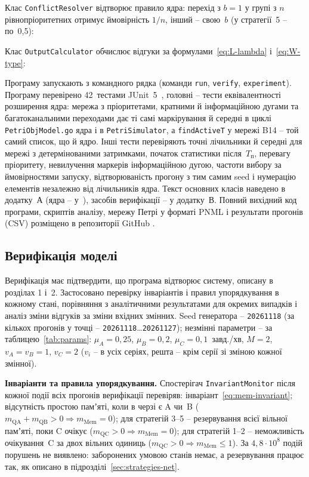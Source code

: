 Клас \texttt{ConflictResolver} відтворює правило ядра: перехід з $b=1$ у групі з $n$
рівнопріоритетних отримує ймовірність $1/n$, інший -- свою~$b$ (у стратегії~5 -- по~0,5):

Клас \texttt{OutputCalculator} обчислює відгуки за формулами~\eqref{eq:L-lambda}
і~\eqref{eq:W-type}:

Програму запускають з командного рядка (команди \texttt{run}, \texttt{verify},
\texttt{experiment}). Програму перевірено 42~тестами JUnit~5~\cite{junit}, головні -- тести
еквівалентності розширення ядра: мережа з пріоритетами, кратними й інформаційною дугами та багатоканальними
переходами дає ті самі маркірування й середні в циклі \texttt{PetriObjModel.go} ядра і в
\texttt{PetriSimulator}, а \texttt{findActiveT} у мережі B14 -- той самий список, що й ядро. Інші
тести перевіряють точні лічильники й середні для мережі з детермінованими затримками, початок
статистики після~$T_{\text{п}}$, перевагу пріоритету, невилучення маркерів інформаційною дугою,
частоти вибору за ймовірностями запуску, відтворюваність прогону з тим самим seed і нумерацію
елементів незалежно від лічильників ядра. Текст
основних класів наведено в додатку~А (ядра -- у~\cite{petriobjmodelpaint}), засобів верифікації --
у додатку~В. Повний вихідний код програми, скриптів аналізу, мережу Петрі у форматі PNML і
результати прогонів (CSV) розміщено в репозиторії GitHub \repourl.

\subsection{Верифікація моделі}\label{sec:verification}

Верифікація має підтвердити, що програма відтворює систему, описану в розділах 1 і~2. Застосовано
перевірку інваріантів і правил упорядкування в кожному стані, порівняння з аналітичними
результатами для окремих випадків і аналіз зміни відгуків за зміни вхідних змінних. Seed
генератора -- \texttt{20261118} (за кількох прогонів у точці -- \texttt{20261118}…\texttt{20261127});
незмінні параметри -- за таблицею~\ref{tab:params}: $\mu_A = 0{,}25$, $\mu_B = 0{,}2$,
$\mu_C = 0{,}1$~завд./хв, $M = 2$, $v_A = v_B = 1$, $v_C = 2$ ($v_i$ -- в усіх серіях, решта -- крім
серії зі зміною кожної змінної).

\textbf{Інваріанти та правила упорядкування.} Спостерігач \texttt{InvariantMonitor} після
кожної події всіх прогонів верифікації перевіряв: інваріант~\eqref{eq:mem-invariant}; відсутність
простою памʼяті, коли в черзі є A чи~B ($m_{\text{QA}} + m_{\text{QB}} > 0 \Rightarrow
m_{\text{Mem}} = 0$); для стратегій 3--5 -- резервування всієї вільної памʼяті, поки C очікує
($m_{\text{QC}} > 0 \Rightarrow m_{\text{Mem}} = 0$); для стратегій 1--2 -- неможливість очікування~C
за двох вільних одиниць ($m_{\text{QC}} > 0 \Rightarrow m_{\text{Mem}} \le 1$). За
$4{,}8\cdot10^8$ подій порушень не виявлено: заборонених умовою станів немає, а резервування працює
так, як описано в підрозділі~\ref{sec:strategies-net}.

